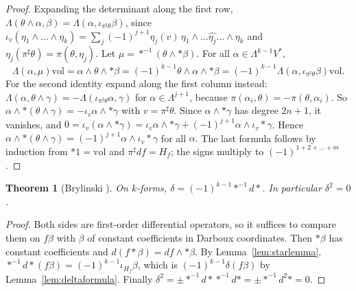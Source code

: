 \documentclass[11pt,oneside,reqno]{article}
\newcommand{\vol}{\mathrm{vol}}
\theoremstyle{plain}
\newtheorem{theorem}{Theorem}[section]
\theoremstyle{definition}
\theoremstyle{remark}
\begin{document}
\begin{proof}
Expanding the determinant along the first row,
\(\Lambda(\theta\wedge\alpha,\beta)=\Lambda(\alpha,\iota_{\pi^\sharp\theta}\beta)\), since
\(\iota_v(\eta_1\wedge\dots\wedge\eta_k)=\sum_j(-1)^{j+1}\eta_j(v)\,\eta_1\wedge\dots
\widehat{\eta_j}\dots\wedge\eta_k\) and \(\eta_j(\pi^\sharp\theta)=\pi(\theta,\eta_j)\). Let
\(\mu=*^{-1}(\theta\wedge*\beta)\). For all \(\alpha\in\Lambda^{k-1}V^*\),
\[
 \Lambda(\alpha,\mu)\vol=\alpha\wedge\theta\wedge*\beta=(-1)^{k-1}\theta\wedge\alpha\wedge*\beta
 =(-1)^{k-1}\Lambda(\alpha,\iota_{\pi^\sharp\theta}\beta)\vol .
\]
For the second identity expand along the first column instead:
\(\Lambda(\alpha,\theta\wedge\gamma)=-\Lambda(\iota_{\pi^\sharp\theta}\alpha,\gamma)\) for
\(\alpha\in\Lambda^{j+1}\), because \(\pi(\alpha_i,\theta)=-\pi(\theta,\alpha_i)\). So
\(\alpha\wedge*(\theta\wedge\gamma)=-\iota_v\alpha\wedge*\gamma\) with \(v=\pi^\sharp\theta\). Since
\(\alpha\wedge*\gamma\) has degree \(2n+1\), it vanishes, and
\(0=\iota_v(\alpha\wedge*\gamma)=\iota_v\alpha\wedge*\gamma+(-1)^{j+1}\alpha\wedge\iota_v*\gamma\).
Hence \(\alpha\wedge*(\theta\wedge\gamma)=(-1)^{j+1}\alpha\wedge\iota_v*\gamma\) for all
\(\alpha\). The last formula follows by induction from \(*1=\vol\) and
\(\pi^\sharp df=H_f\); the signs multiply to \((-1)^{1+2+\dots+m}\).
\end{proof}

\begin{theorem}[Brylinski \cite{Brylinski}]\label{thm:brylinski}
On \(k\)-forms, \(\delta=(-1)^{k-1}*^{-1}d*\). In particular \(\delta^2=0\).
\end{theorem}

\begin{proof}
Both sides are first-order differential operators, so it suffices to
compare them on \(f\beta\) with \(\beta\) of constant coefficients in Darboux
coordinates. Then \(*\beta\) has constant coefficients and
\(d(f*\beta)=df\wedge*\beta\). By Lemma~\ref{lem:starlemma},
\(*^{-1}d*(f\beta)=(-1)^{k-1}\iota_{H_f}\beta\), which is \((-1)^{k-1}\delta(f\beta)\) by
Lemma~\ref{lem:deltaformula}. Finally
\(\delta^2=\pm*^{-1}d**^{-1}d*=\pm*^{-1}d^2*=0\).
\end{proof}
\end{document}
